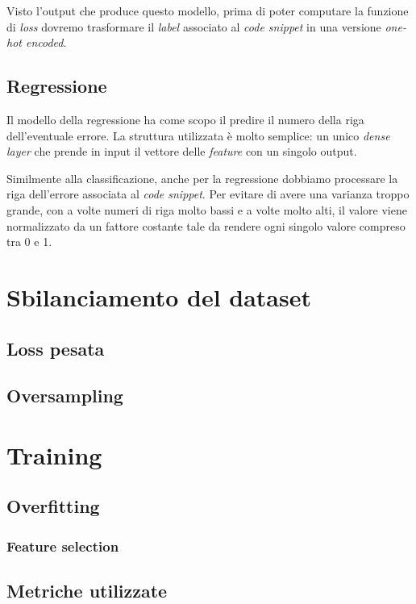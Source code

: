Visto l'output che produce questo modello, prima di poter computare la funzione di \textit{loss} dovremo trasformare il \textit{label} associato al \textit{code snippet} in una versione \textit{one-hot encoded}. 




\subsection{Regressione}
Il modello della regressione ha come scopo il predire il numero della riga dell'eventuale errore.
La struttura utilizzata è molto semplice: un unico \textit{dense layer} che prende in input il vettore delle \textit{feature} con un singolo output.

Similmente alla classificazione, anche per la regressione dobbiamo processare la riga dell'errore associata al \textit{code snippet}. 
Per evitare di avere una varianza troppo grande, con a volte numeri di riga molto bassi e a volte molto alti, il valore viene normalizzato da un fattore costante tale da rendere ogni singolo valore compreso tra 0 e 1.



\section{Sbilanciamento del dataset}\label{sec:sbilanciamento}
\subsection{Loss pesata}
\subsection{Oversampling}

\section{Training}
\subsection{Overfitting}
    \subsubsection{Feature selection}
\subsection{Metriche utilizzate}

